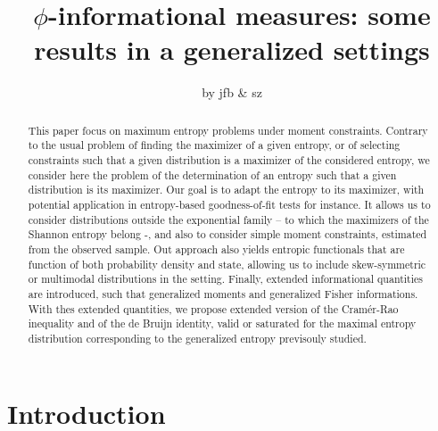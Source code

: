 \documentclass[english,sort&compress]{elsarticle}
\theoremstyle{definition}
\theoremstyle{plain}
\theoremstyle{plain}
\begin{document}

\title{$\phi$-informational  measures:  some results in a generalized  settings}
%
\author{by jfb \& sz \date{} }
\begin{abstract}
   This paper
  focus on  maximum entropy problems  under moment constraints. Contrary  to the
  usual problem  of finding the  maximizer of a  given entropy, or  of selecting
  constraints such  that a given distribution  is a maximizer  of the considered
  entropy, we consider here the problem  of the determination of an entropy such
  that a given  distribution is its maximizer. Our goal is  to adapt the entropy
  to its maximizer, with  potential application in entropy-based goodness-of-fit
  tests  for  instance. It  allows  us  to  consider distributions  outside  the
  exponential family – to which the  maximizers of the Shannon entropy belong -,
  and also  to consider simple  moment constraints, estimated from  the observed
  sample. Out  approach also  yields entropic functionals  that are  function of
  both probability density  and state, allowing us to  include skew-symmetric or
  multimodal  distributions  in  the  setting. Finally,  extended  informational
  quantities  are  introduced, such  that  generalized  moments and  generalized
  Fisher  informations.  With  thes  extended quantities,  we  propose  extended
  version of the Cram\'er-Rao inequality and of the de Bruijn identity, valid or
  saturated  for   the  maximal   entropy  distribution  corresponding   to  the
  generalized entropy previsouly studied.
\end{abstract}

\maketitle



\section{Introduction}
\label{sec:Intro}
\end{document}
